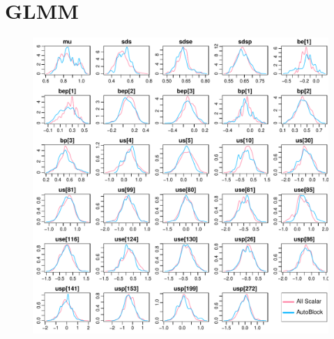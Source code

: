 \documentclass{article}
\begin{document}
\section{GLMM}
\begin{figure}[h]
\centerline{\includegraphics[scale=1.0]{GLMM}}
\end{figure}
\thispagestyle{empty}
\clearpage
\end{document}
